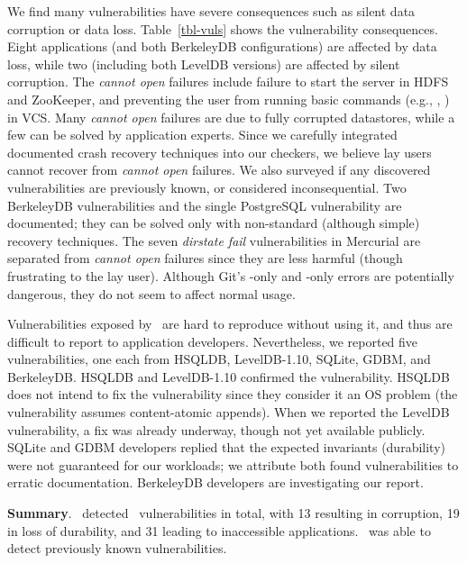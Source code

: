 We find many vulnerabilities have severe consequences such as silent data
corruption or data loss.
Table~\ref{tbl-vuls} shows
the vulnerability consequences. Eight applications (and both BerkeleyDB
configurations) are affected by data loss, while two (including both
LevelDB versions) are affected by silent corruption. The \textit{cannot open}
failures include failure to start the server in HDFS and ZooKeeper, and 
preventing the user from running basic commands (e.g., ,
) in VCS. Many \textit{cannot open} failures are due to
fully corrupted datastores, while a few can be solved by application experts.
Since we carefully integrated documented crash recovery techniques into
our checkers, we believe lay users cannot recover from \textit{cannot open}
failures. We also surveyed if any discovered vulnerabilities are previously known,
or considered inconsequential. Two BerkeleyDB vulnerabilities and the single
PostgreSQL vulnerability are documented; they can be solved only with
non-standard (although simple) recovery techniques. The seven \textit{dirstate
fail} vulnerabilities in Mercurial are separated from \textit{cannot
open} failures since they are less harmful (though frustrating to the lay user).
Although Git's -only and -only errors are potentially
dangerous, they do not seem to affect normal usage.

Vulnerabilities exposed by \toolname\ are hard to reproduce without using it,
and thus are difficult to report to application developers. Nevertheless, we
reported five vulnerabilities, one each from HSQLDB, LevelDB-1.10, SQLite,
GDBM, and BerkeleyDB. HSQLDB and LevelDB-1.10 confirmed the vulnerability.
HSQLDB does not intend to fix the vulnerability since they consider it an OS
problem (the vulnerability assumes content-atomic appends). When we reported the
LevelDB vulnerability, a fix was already underway, though not yet available
publicly. SQLite and GDBM developers replied that the expected invariants
(durability) were not guaranteed for our workloads; we attribute both found
vulnerabilities to erratic documentation. BerkeleyDB developers are
investigating our report.

\textbf{Summary}. \toolname\ detected \totbugs\ vulnerabilities in total, with 13
resulting in corruption, 19 in loss of durability, and 31 leading to
inaccessible applications. \toolname\ was able to detect previously known
vulnerabilities. 


